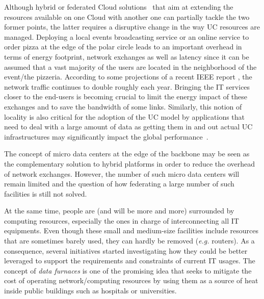 Although hybrid or federated Cloud solutions~\cite{armbrust:2010} that aim at extending
the resources available on one Cloud  with another one
can partially tackle the two former points, the latter requires a disruptive change in
the way UC resources are managed. Deploying a local events broadcasting service or an
online service to order pizza at the edge of the polar circle leads to an important overhead
in terms of energy footprint, network exchanges as well as latency since it can be assumed
that a vast majority of the users are located in the neighborhood of the event/the
pizzeria.  According to some projections of a recent IEEE report
\cite{ieeenetreport:2012}, the network traffic continues to double roughly each
year. Bringing the IT services closer to the end-users is becoming crucial to limit
the energy impact of these exchanges and to save the bandwidth of some links. Similarly,
this notion of locality is also critical for the adoption of the UC model by applications
that need to deal with a large amount of data as getting them in and out actual UC
infrastructures may significantly impact the global performance~\cite{Fos11}. 

The concept of micro data centers at the edge of the backbone
\cite{greenberg:sigcomm09} may be seen as the complementary solution to hybrid
platforms in order to reduce the overhead of network exchanges.  However, the
number of such micro data centers will remain limited and the question of how
federating a large number of such facilities is still not solved.  

At the same time, people are (and will be more and more) surrounded by
computing resources, especially the ones in charge of interconnecting all IT
equipments.  Even though these small and medium-size facilities include
resources that are sometimes barely used, they can hardly be removed (\textit{e.g.} routers). As
a consequence, several initiatives started investigating how they could be
better leveraged to support the requirements and constraints of current IT
usages.  The concept of \emph{data furnaces} \cite{liu:hotcloud11} is one of
the promising idea that seeks to mitigate the cost of operating
network/computing resources by using them as a source of heat inside public
buildings such as hospitals or universities. 


